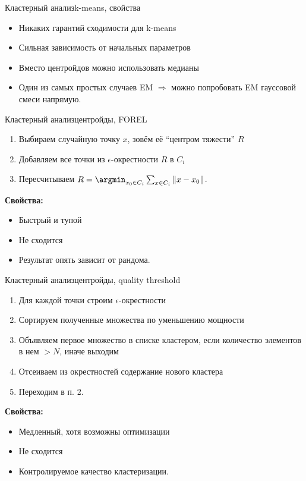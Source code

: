 \documentclass[14pt, fleqn, xcolor={dvipsnames, table}]{beamer}
\begin{document}
\begin{frame}{Кластерный анализ}{k-means, свойства}
\begin{itemize}
  \item Никаких гарантий сходимости для k-means
  \item Сильная зависимость от начальных параметров
  \item Вместо центройдов можно использовать медианы
  \item Один из самых простых случаев EM $\Rightarrow$ можно попробовать EM гауссовой смеси напрямую.
\end{itemize}
\end{frame}


\begin{frame}{Кластерный анализ}{центройды, FOREL}
\begin{enumerate}
  \item Выбираем случайную точку $x$, зовём её ``центром тяжести'' $R$
  \item Добавляем все точки из $\epsilon$-окрестности $R$ в $C_i$
  \item Пересчитываем $R = \argmin_{x_0 \in C_i}\sum_{x\in C_i} \|x - x_0\|$.
\end{enumerate}
\textbf{Свойства:} 
\begin{itemize}
  \item Быстрый и тупой
  \item Не сходится
  \item Результат опять зависит от рандома.
\end{itemize}
\end{frame}

\begin{frame}{Кластерный анализ}{центройды, quality threshold}
\footnotesize
\begin{enumerate}
  \item Для каждой точки строим $\epsilon$-окрестности
  \item Сортируем полученные множества по уменьшению мощности
  \item Объявляем первое множество в списке кластером, если количество элементов в нем $> N$, иначе выходим
  \item Отсеиваем из окрестностей содержание нового кластера
  \item Переходим в п. 2.
\end{enumerate}
\textbf{Свойства:} 
\begin{itemize}
  \item Медленный, хотя возможны оптимизации
  \item Не сходится
  \item Контролируемое качество кластеризации.
\end{itemize}
\end{frame}
\end{document}
